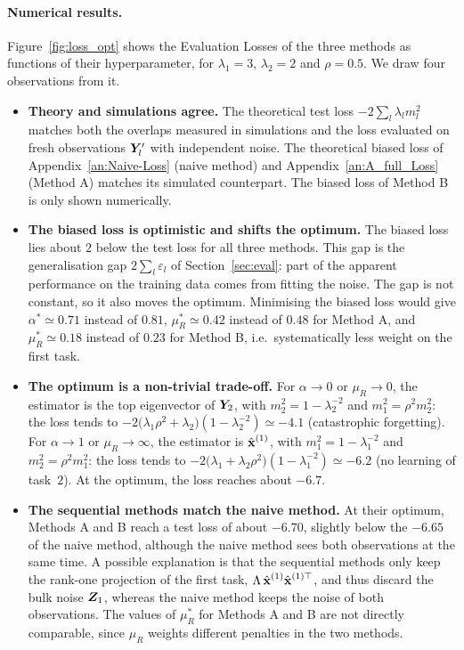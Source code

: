 \paragraph{Numerical results.} Figure~\ref{fig:loss_opt} shows the Evaluation Losses of the three methods as functions of their hyperparameter, for $\lambda_1 = 3$, $\lambda_2 = 2$ and $\rho = 0.5$. We draw four observations from it.
\begin{itemize}
    \item \textbf{Theory and simulations agree.} The theoretical test loss $-2\sum_l\lambda_l m_l^2$ matches both the overlaps measured in simulations and the loss evaluated on fresh observations $\bm{Y}'_l$ with independent noise. The theoretical biased loss of Appendix~\ref{an:Naive-Loss} (naive method) and Appendix~\ref{an:A_full_Loss} (Method A) matches its simulated counterpart. The biased loss of Method B is only shown numerically.

    \item \textbf{The biased loss is optimistic and shifts the optimum.} The biased loss lies about $2$ below the test loss for all three methods. This gap is the generalisation gap $2\sum_l\varepsilon_l$ of Section~\ref{sec:eval}: part of the apparent performance on the training data comes from fitting the noise. The gap is not constant, so it also moves the optimum. Minimising the biased loss would give $\alpha^* \simeq 0.71$ instead of $0.81$, $\mu_R^* \simeq 0.42$ instead of $0.48$ for Method A, and $\mu_R^* \simeq 0.18$ instead of $0.23$ for Method B, i.e.\ systematically less weight on the first task.

    \item \textbf{The optimum is a non-trivial trade-off.} For $\alpha \to 0$ or $\mu_R \to 0$, the estimator is the top eigenvector of $\bm{Y}_2$, with $m_2^2 = 1 - \lambda_2^{-2}$ and $m_1^2 = \rho^2 m_2^2$: the loss tends to $-2\big(\lambda_1\rho^2 + \lambda_2\big)(1-\lambda_2^{-2}) \simeq -4.1$ (catastrophic forgetting). For $\alpha \to 1$ or $\mu_R \to \infty$, the estimator is $\hat{\boldsymbol{\mathbf{x}}}^{(1)}$, with $m_1^2 = 1 - \lambda_1^{-2}$ and $m_2^2 = \rho^2 m_1^2$: the loss tends to $-2\big(\lambda_1 + \lambda_2\rho^2\big)(1-\lambda_1^{-2}) \simeq -6.2$ (no learning of task~$2$). At the optimum, the loss reaches about $-6.7$.

    \item \textbf{The sequential methods match the naive method.} At their optimum, Methods A and B reach a test loss of about $-6.70$, slightly below the $-6.65$ of the naive method, although the naive method sees both observations at the same time. A possible explanation is that the sequential methods only keep the rank-one projection of the first task, $\Lambda\,\hat{\boldsymbol{\mathbf{x}}}^{(1)}\hat{\boldsymbol{\mathbf{x}}}^{(1)\top}$, and thus discard the bulk noise $\bm{Z}_1$, whereas the naive method keeps the noise of both observations. The values of $\mu_R^*$ for Methods A and B are not directly comparable, since $\mu_R$ weights different penalties in the two methods.
\end{itemize}

